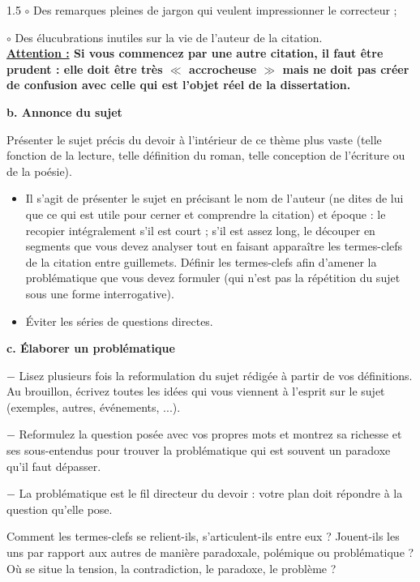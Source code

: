 \documentclass[12pt]{article}
\begin{document}
\begin{spacing}{1.5}
 $\circ$  Des remarques pleines de jargon qui veulent impressionner le correcteur ;

$\circ$ Des élucubrations inutiles sur la vie de l'auteur de la citation.\\ 



 
 
\textbf{\underline{ Attention :} Si vous commencez par une autre citation, il faut être prudent : elle 
doit être très $\ll$ accrocheuse $\gg$ mais ne doit pas créer de confusion avec celle qui est l'objet réel de la dissertation.}

\textbf{ b. Annonce du sujet}

 Présenter le sujet précis du devoir à l'intérieur de ce thème plus vaste (telle 
fonction de la lecture, telle définition du roman, telle conception de l'écriture 
ou de la poésie).

\begin{itemize}
\item Il s'agit de présenter le sujet en précisant le nom de l'auteur (ne dites de lui que ce qui est utile pour cerner et comprendre la citation) et époque : le recopier intégralement s'il est court ; s'il est assez long, le découper en segments que vous devez analyser tout en faisant apparaître les termes-clefs de la citation entre guillemets. Définir les termes-clefs afin d'amener la problématique que vous devez formuler (qui n'est pas la répétition du sujet sous une forme 
interrogative).
\item  Éviter les séries de questions directes.
\end{itemize}

\quad
\textbf{ c. Élaborer un problématique}

$-$ Lisez plusieurs fois la reformulation du sujet rédigée à partir de vos définitions. Au brouillon, écrivez toutes les idées qui vous viennent à l'esprit sur le sujet (exemples, autres, événements, ...).


$-$ Reformulez la question posée avec vos propres mots et montrez sa richesse et ses sous-entendus pour trouver la problématique qui est souvent un paradoxe qu'il faut dépasser.

$-$ La problématique est le fil directeur du devoir : votre plan doit répondre à la question qu'elle 
pose.

Comment les termes-clefs se relient-ils, s'articulent-ils entre eux ? Jouent-ils les uns par rapport aux autres de manière paradoxale, polémique ou problématique ? Où se 
situe la tension, la contradiction, le paradoxe, le problème ?
 

\end{spacing}
\end{document}
